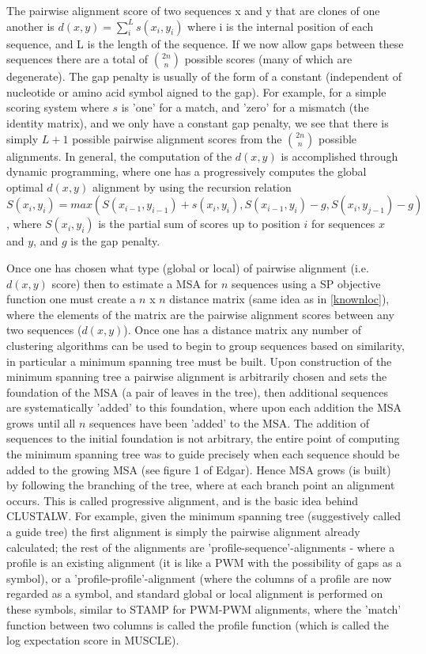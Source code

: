 	The pairwise alignment score of two sequences x and y that are clones of one another is $d(x,y)=\sum_i^L s(x_i, y_i)$ where i is the internal position of each sequence, and L is the length of the sequence.  If we now allow gaps between these sequences there are a total of $2n \choose n$ possible scores (many of which are degenerate).  The gap penalty is usually of the form of a constant (independent of nucleotide or amino acid symbol aigned to the gap).  For example, for a simple scoring system where $s$ is 'one' for a match, and 'zero' for a mismatch (the identity matrix), and we only have a constant gap penalty, we see that there is simply $L+1$ possible pairwise alignment scores from the $2n \choose n$ possible alignments.  In general, the computation of the $d(x,y)$ is accomplished through dynamic programming, where one has a progressively computes the global optimal $d(x,y)$ alignment by using the recursion relation $S(x_i,y_i)=max( S(x_{i-1},y_{i-1}) +s(x_i,y_i), S(x_{i-1},y_{i}) - g, S(x_{i},y_{j-1})  -g)$, where $S(x_i,y_i)$ is the partial sum of scores up to position $i$ for sequences $x$ and $y$, and $g$ is the gap penalty.    
	
	Once one has chosen what type (global or local) of pairwise alignment (i.e. $d(x,y)$ score) then to estimate a MSA for $n$ sequences using a SP objective function one must create a $n$ x $n$ distance matrix (same idea as in \ref{knownloc}), where the elements of the matrix are the pairwise alignment scores between any two sequences ($d(x,y)$).  Once one has a distance matrix any number of clustering algorithms can be used to begin to group sequences based on similarity, in particular a minimum spanning tree must be built.  Upon construction of the minimum spanning tree a pairwise alignment is arbitrarily chosen and sets the foundation of the MSA (a pair of leaves in the tree), then additional sequences are systematically 'added' to this foundation, where upon each addition the MSA grows until all $n$ sequences have been 'added' to the MSA.  The addition of sequences to the initial foundation is not arbitrary, the entire point of computing the minimum spanning tree was to guide precisely when each sequence should be added to the growing MSA (see figure 1 of Edgar\cite{pmid15318951}).  Hence MSA grows (is built) by following the branching of the tree, where at each branch point an alignment occurs.  This is called progressive alignment, and is the basic idea behind CLUSTALW.  For example, given the minimum spanning tree (suggestively called a guide tree) the first alignment is simply the pairwise alignment already calculated; the rest of the alignments are 'profile-sequence'-alignments - where a profile is an existing alignment (it is like a PWM with the possibility of gaps as a symbol), or a 'profile-profile'-alignment (where the columns of a profile are now regarded as a symbol, and standard global or local alignment is performed on these symbols, similar to STAMP for PWM-PWM alignments, where the 'match' function between two columns is called the profile function (which is called the log expectation score in MUSCLE).  
	
